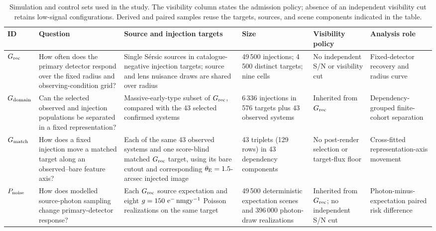 \begin{table}
\caption{Simulation and control sets used in the study. The visibility
column states the admission policy; absence of an independent visibility cut
retains low-signal configurations. Derived and paired samples reuse the
targets, sources, and scene components indicated in the table.}
\label{tab:simulation_sets}
\centering
{\small
\setlength{\tabcolsep}{2.5pt}
\begin{tabular}{L{0.10\textwidth}L{0.18\textwidth}L{0.20\textwidth}L{0.14\textwidth}L{0.16\textwidth}L{0.15\textwidth}}
\toprule
ID & Question & Source and injection targets & Size & Visibility policy & Analysis role \\
\midrule
$G_{\rm rec}$ &
How often does the primary detector respond over the fixed radius and
observing-condition grid? &
Single S\'{e}rsic sources in catalogue-negative injection targets; source and
lens nuisance draws are shared over radius &
49\,500 injections; 4\,500 distinct targets; nine cells &
No independent S/N or visibility cut &
Fixed-detector recovery and radius curve \\

$G_{\rm domain}$ &
Can the selected observed and injection populations be separated in a fixed
representation? &
Massive-early-type subset of \(G_{\rm rec}\), compared with the 43
selected confirmed systems &
6\,336 injections in 576 targets plus 43 observed systems &
Inherited from \(G_{\rm rec}\) &
Dependency-grouped finite-cohort separation \\

$G_{\rm match}$ &
How does a fixed injection move a matched target along an observed--bare
feature axis? &
Each of the same 43 observed systems and one score-blind matched
\(G_{\rm rec}\) target, using its bare cutout and corresponding
\(\theta_{\rm E}=1.5\)-arcsec injected image &
43 triplets (129 rows) in 43 dependency components &
No post-render selection or target-flux floor &
Cross-fitted representation-axis movement \\

$P_{\rm noise}$ &
How does modelled source-photon sampling change primary-detector response? &
Each \(G_{\rm rec}\) source expectation and eight
\(g=150\ {\rm e^{-}\,nmgy^{-1}}\) Poisson realizations on the same target &
49\,500 deterministic expectation scenes and 396\,000 photon-draw
realizations &
Inherited from \(G_{\rm rec}\); no independent S/N cut &
Photon-minus-expectation paired risk difference \\


\end{tabular}}
\end{table}
